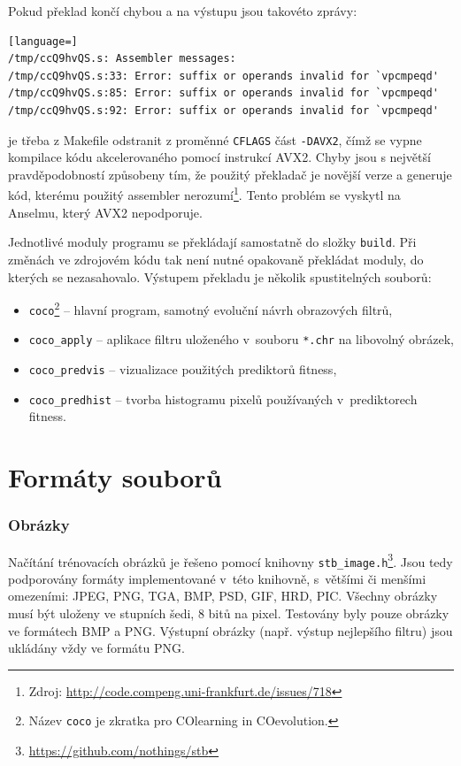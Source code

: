 Pokud překlad končí chybou a na výstupu jsou takovéto zprávy:

\begin{lstlisting}[language=]
/tmp/ccQ9hvQS.s: Assembler messages:
/tmp/ccQ9hvQS.s:33: Error: suffix or operands invalid for `vpcmpeqd'
/tmp/ccQ9hvQS.s:85: Error: suffix or operands invalid for `vpcmpeqd'
/tmp/ccQ9hvQS.s:92: Error: suffix or operands invalid for `vpcmpeqd'
\end{lstlisting}

\noindent{}je třeba z Makefile odstranit z proměnné \texttt{CFLAGS} část \texttt{-DAVX2}, čímž se vypne kompilace kódu akcelerovaného pomocí instrukcí AVX2. Chyby jsou s největší pravděpodobností způsobeny tím, že použitý překladač je novější verze a generuje kód, kterému použitý assembler nerozumí\footnote{Zdroj: \url{http://code.compeng.uni-frankfurt.de/issues/718}}. Tento problém se vyskytl na Anselmu, který AVX2 nepodporuje.

Jednotlivé moduly programu se překládají samostatně do složky \texttt{build}. Při změnách ve zdrojovém kódu tak není nutné opakovaně překládat moduly, do kterých se nezasahovalo. Výstupem překladu je několik spustitelných souborů:

\begin{itemize}
    \item \texttt{coco}\footnote{Název \texttt{coco} je zkratka pro COlearning in COevolution.} -- hlavní program, samotný evoluční návrh obrazových filtrů,
    \item \texttt{coco\_apply} -- aplikace filtru uloženého v~souboru \texttt{*.chr} na libovolný obrázek,
    \item \texttt{coco\_predvis} -- vizualizace použitých prediktorů fitness,
    \item \texttt{coco\_predhist} -- tvorba histogramu pixelů používaných v~prediktorech fitness.
\end{itemize}

\section{Formáty souborů}

\subsubsection*{Obrázky}

Načítání trénovacích obrázků je řešeno pomocí knihovny \texttt{stb\_image.h}\footnote{\url{https://github.com/nothings/stb}}. Jsou tedy podporovány formáty implementované v~této knihovně, s~většími či menšími omezeními: JPEG, PNG, TGA, BMP, PSD, GIF, HRD, PIC. Všechny obrázky musí být uloženy ve stupních šedi, 8 bitů na pixel. Testovány byly pouze obrázky ve formátech BMP a PNG. Výstupní obrázky (např. výstup nejlepšího filtru) jsou ukládány vždy ve formátu PNG.

